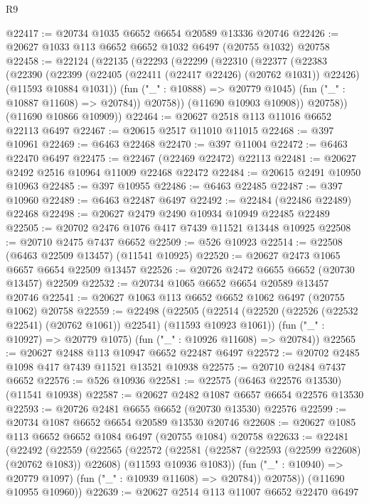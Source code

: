 \begin{lexlean}{R9}
\begin{coremodule}
{{{{{{{{{{{{{{{{{{{{{{{{{{{{{{{{{{{{{{{{{{{{{{{{{{{{{{{{{{{{{{{{{{{{{{{{{{{{{{{{{{{{@22417 := @20734 @1035 @6652 @6654 @20589 @13336 @20746
@22426 := @20627 @1033 @113 @6652 @6652 @1032 @6497 (@20755 @1032) @20758
@22458 := @22124
    (@22135
      (@22293
        (@22299
          (@22310
            (@22377
              (@22383
                (@22390
                  (@22399
                    (@22405 (@22411 (@22417 @22426) (@20762 @1031)) @22426)
                    (@11593 @10884 @1031))
                  (fun ("_" : @10888) => @20779 @1045)
                  (fun ("_" : @10887 @11608) => @20784))
                @20758))
            (@11690 @10903 @10908))
          @20758))
      (@11690 @10866 @10909))
@22464 := @20627 @2518 @113 @11016 @6652 @22113 @6497
@22467 := @20615 @2517 @11010 @11015
@22468 := @397 @10961
@22469 := @6463 @22468
@22470 := @397 @11004
@22472 := @6463 @22470 @6497
@22475 := @22467 (@22469 @22472) @22113
@22481 := @20627 @2492 @2516 @10964 @11009 @22468 @22472
@22484 := @20615 @2491 @10950 @10963
@22485 := @397 @10955
@22486 := @6463 @22485
@22487 := @397 @10960
@22489 := @6463 @22487 @6497
@22492 := @22484 (@22486 @22489) @22468
@22498 := @20627 @2479 @2490 @10934 @10949 @22485 @22489
@22505 := @20702 @2476 @1076 @417 @7439 @11521 @13448 @10925
@22508 := @20710 @2475 @7437 @6652
@22509 := @526 @10923
@22514 := @22508 (@6463 @22509 @13457) (@11541 @10925)
@22520 := @20627 @2473 @1065 @6657 @6654 @22509 @13457
@22526 := @20726 @2472 @6655 @6652 (@20730 @13457) @22509
@22532 := @20734 @1065 @6652 @6654 @20589 @13457 @20746
@22541 := @20627 @1063 @113 @6652 @6652 @1062 @6497 (@20755 @1062) @20758
@22559 := @22498
    (@22505
      (@22514 (@22520 (@22526 (@22532 @22541) (@20762 @1061)) @22541) (@11593 @10923 @1061))
      (fun ("_" : @10927) => @20779 @1075)
      (fun ("_" : @10926 @11608) => @20784))
@22565 := @20627 @2488 @113 @10947 @6652 @22487 @6497
@22572 := @20702 @2485 @1098 @417 @7439 @11521 @13521 @10938
@22575 := @20710 @2484 @7437 @6652
@22576 := @526 @10936
@22581 := @22575 (@6463 @22576 @13530) (@11541 @10938)
@22587 := @20627 @2482 @1087 @6657 @6654 @22576 @13530
@22593 := @20726 @2481 @6655 @6652 (@20730 @13530) @22576
@22599 := @20734 @1087 @6652 @6654 @20589 @13530 @20746
@22608 := @20627 @1085 @113 @6652 @6652 @1084 @6497 (@20755 @1084) @20758
@22633 := @22481
    (@22492
      (@22559
        (@22565
          (@22572
            (@22581 (@22587 (@22593 (@22599 @22608) (@20762 @1083)) @22608) (@11593 @10936 @1083))
            (fun ("_" : @10940) => @20779 @1097)
            (fun ("_" : @10939 @11608) => @20784))
          @20758))
      (@11690 @10955 @10960))
@22639 := @20627 @2514 @113 @11007 @6652 @22470 @6497
}}}}}}}}}}}}}}}}}}}}}}}}}}}}}}}}}}}}}}}}}}}}}}}}}}}}}}}}}}}}}}}}}}}}}}}}}}}}}}}}}}}}
\end{coremodule}
\end{lexlean}

